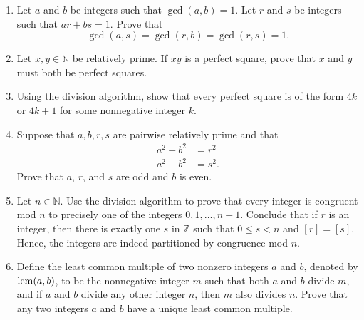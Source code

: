 {\begin{enumerate}
\begin{enumerate}
 \item
Prove that $f_n = [(1 + \sqrt{5}\, )^n - (1 - \sqrt{5}\, )^n]/ 2^n \sqrt{5}$.
 
 \item
Show that $\lim_{n \rightarrow \infty} f_n / f_{n + 1} = (\sqrt{5} - 1)/2$. 
 
 \item
Prove that $f_n$ and $f_{n + 1}$ are relatively prime.
 
\end{enumerate}

\item
Let $a$ and $b$ be integers such that $\gcd(a,b) = 1$.  Let $r$ and $s$ be integers such that $ar + bs =1$.  Prove that 
\[
\gcd(a,s) = \gcd(r,b) = \gcd(r,s) =  1.
\]

\item
Let $x, y \in {\mathbb N}$ be relatively prime.  If $xy$ is a perfect square, prove that $x$ and $y$ must both be perfect squares.

\item
Using the division algorithm, show that every perfect square is of the form $4k$ or $4k + 1$ for some nonnegative integer $k$.

\item
Suppose that $a, b, r, s$ are pairwise relatively prime and that
\begin{align*}
a^2 + b^2 & = r^2 \\
a^2 - b^2 & = s^2.
\end{align*}
Prove that $a$, $r$, and $s$ are odd and $b$ is even.

 
\item
Let $n \in {\mathbb N}$.  Use the division algorithm to prove that every integer is congruent mod $n$ to precisely one of the integers $0, 1, \ldots, n-1$.  Conclude that if $r$ is an integer, then there is exactly one $s$ in ${\mathbb Z}$ such that $0 \leq s < n$ and $[r] = [s]$.   Hence, the integers are indeed partitioned by congruence mod $n$. 

\item
Define the {\bfi least common multiple\/} of two nonzero integers $a$ and $b$, denoted by $\operatorname{lcm}(a,b)$\label{leastcm}, to be the nonnegative integer $m$ such that both $a$ and $b$ divide $m$, and if $a$ and $b$  divide any other integer $n$, then $m$ also divides $n$.  Prove that any two integers $a$ and $b$ have a unique least common multiple. 


\end{enumerate}}
